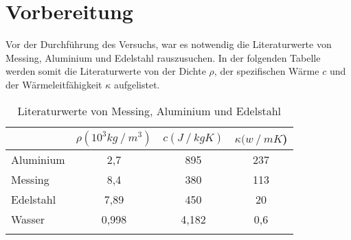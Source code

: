 \section{Vorbereitung}
\label{sec:Vorbereitung}

Vor der Durchführung des Versuchs, war es notwendig die Literaturwerte von Messing, Aluminium und Edelstahl rauszusuchen.
In der folgenden Tabelle werden somit die Literaturwerte von der Dichte $\rho$, der spezifischen Wärme $c$ und der Wärmeleitfähigkeit $\kappa$ aufgelistet.

\begin{table}
    \centering
    \caption{Literaturwerte von Messing, Aluminium und Edelstahl}
    \label{fig:Literatur} 
    \begin{tabular}{
        l
        c
        c
        c
        }
    \toprule
    & {$\rho (10^3\si{kg}\mathbin{/}\si{m^3})$} &{$c (\si{J}\mathbin{/}\si{kg}\si{K})$} & {$\kappa (\si{w}\mathbin{/}\si{mK}$)} \\
    \midrule
        Aluminium & 2,7 & 895 & 237 \\
        Messing & 8,4 & 380 & 113 \\
        Edelstahl & 7,89 & 450 & 20\\
        Wasser & 0,998 & 4,182 & 0,6 \\
    \bottomrule
    \cite[378,381]{PhyPrak}  
    \end{tabular}
    \label{tab:Vorbereitung}
\end{table}